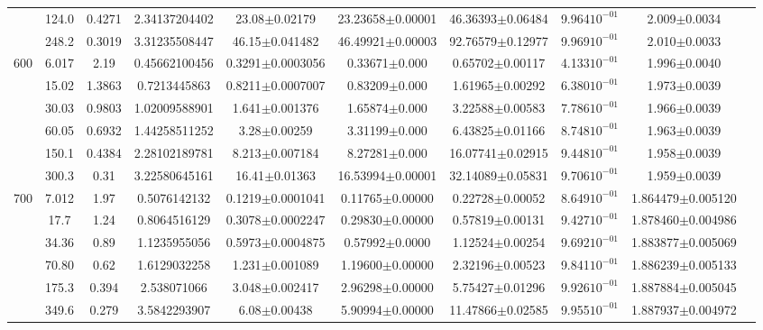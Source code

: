 \begin{landscape}
\begin{table}[ht]
\begin{tabular}{| c | c | c | c | c | c | c | c | c | c |}
\cline{2-9}
&124.0 & 0.4271 & 2.34137204402 & 23.08$\pm$0.02179 & 23.23658$\pm$0.00001 & 46.36393$\pm$0.06484 & 9.964$10^{-01}$ & 2.009$\pm$0.0034\\
\cline{2-9}
&248.2 & 0.3019 & 3.31235508447 & 46.15$\pm$0.041482 & 46.49921$\pm$0.00003 & 92.76579$\pm$0.12977 & 9.969$10^{-01}$ & 2.010$\pm$0.0033\\
\hline \hline
\multirow {6}{*}{600}&6.017 & 2.19 & 0.45662100456 & 0.3291$\pm$0.0003056 & 0.33671$\pm$0.000 & 0.65702$\pm$0.00117 & 4.133$10^{-01}$ & 1.996$\pm$0.0040\\
\cline{2-9}
&15.02 & 1.3863 & 0.7213445863 & 0.8211$\pm$0.0007007 & 0.83209$\pm$0.000 & 1.61965$\pm$0.00292 & 6.380$10^{-01}$ & 1.973$\pm$0.0039\\
\cline{2-9}
&30.03 & 0.9803 & 1.02009588901 & 1.641$\pm$0.001376 & 1.65874$\pm$0.000 & 3.22588$\pm$0.00583 & 7.786$10^{-01}$ & 1.966$\pm$0.0039\\
\cline{2-9}
&60.05 & 0.6932 & 1.44258511252 & 3.28$\pm$0.00259 & 3.31199$\pm$0.000 & 6.43825$\pm$0.01166 & 8.748$10^{-01}$ & 1.963$\pm$0.0039\\
\cline{2-9}
&150.1 & 0.4384 & 2.28102189781 & 8.213$\pm$0.007184 & 8.27281$\pm$0.000 & 16.07741$\pm$0.02915 & 9.448$10^{-01}$ & 1.958$\pm$0.0039\\
\cline{2-9}
&300.3 & 0.31 & 3.22580645161 & 16.41$\pm$0.01363 & 16.53994$\pm$0.00001 & 32.14089$\pm$0.05831 & 9.706$10^{-01}$ & 1.959$\pm$0.0039\\
\hline\hline
\multirow {6}{*}{700} & 7.012 & 1.97 & 0.5076142132 & 0.1219$\pm$0.0001041 & 0.11765$\pm$0.00000 & 0.22728$\pm$0.00052 & 8.649$10^{-01}$ & 1.864479$\pm$0.005120\\
\cline{2-9}
& 17.7 & 1.24 &  0.8064516129 & 0.3078$\pm$0.0002247 & 0.29830$\pm$0.00000 & 0.57819$\pm$0.00131 & 9.427$10^{-01}$ & 1.878460$\pm$0.004986\\
\cline{2-9}
& 34.36 & 0.89 & 1.1235955056 & 0.5973$\pm$0.0004875 & 0.57992$\pm$0.0000 & 1.12524$\pm$0.00254 & 9.692$10^{-01}$ & 1.883877$\pm$0.005069\\
\cline{2-9}
& 70.80 & 0.62 & 1.6129032258 & 1.231$\pm$0.001089 & 1.19600$\pm$0.00000 & 2.32196$\pm$0.00523 & 9.841$10^{-01}$ & 1.886239$\pm$0.005133\\
\cline{2-9}
& 175.3 & 0.394 & 2.538071066 & 3.048$\pm$0.002417 & 2.96298$\pm$0.00000 & 5.75427$\pm$0.01296 & 9.926$10^{-01}$ & 1.887884$\pm$0.005045\\
\cline{2-9}
& 349.6 & 0.279 & 3.5842293907 & 6.08$\pm$0.00438 & 5.90994$\pm$0.00000 & 11.47866$\pm$0.02585 & 9.955$10^{-01}$ & 1.887937$\pm$0.004972\\
\hline \hline

\end{tabular}
\label{table:mg_sushi_compare}
\end{table}\end{landscape}
